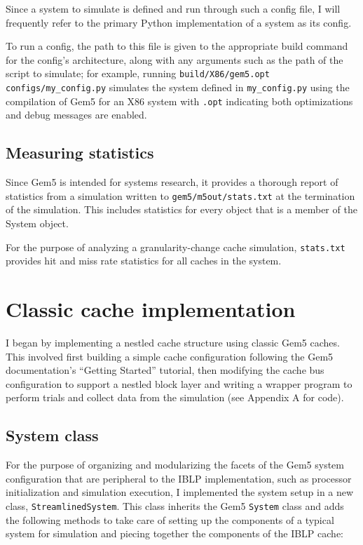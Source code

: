 \documentclass[12pt,twoside]{reedthesis}
\begin{document}
	Since a system to simulate is defined and run through such a config file, I will frequently refer to the primary Python implementation of a system as its config.

	To run a config, the path to this file is given to the appropriate build command for the config's architecture, along with any arguments such as the path of the script to simulate; for example, running \verb`build/X86/gem5.opt configs/my_config.py` simulates the system defined in \verb`my_config.py` using the compilation of Gem5 for an X86 system with \verb`.opt` indicating both optimizations and debug messages are enabled.

	\subsection*{Measuring statistics}

	Since Gem5 is intended for systems research, it provides a thorough report of statistics from a simulation written to \verb`gem5/m5out/stats.txt` at the termination of the simulation. This includes statistics for every object that is a member of the System object.

	For the purpose of analyzing a granularity-change cache simulation, \verb`stats.txt` provides hit and miss rate statistics for all caches in the system.

\section{Classic cache implementation}

	I began by implementing a nestled cache structure using classic Gem5 caches. This involved first building a simple cache configuration following the Gem5 documentation's ``Getting Started'' tutorial, then modifying the cache bus configuration to support a nestled block layer and writing a wrapper program to perform trials and collect data from the simulation (see Appendix A for code).

	\subsection*{System class}

	For the purpose of organizing and modularizing the facets of the Gem5 system configuration that are peripheral to the IBLP implementation, such as processor initialization and simulation execution, I implemented the system setup in a new class, \verb`StreamlinedSystem`. This class inherits the Gem5 \verb`System` class and adds the following methods to take care of setting up the components of a typical system for simulation and piecing together the components of the IBLP cache:
\end{document}
